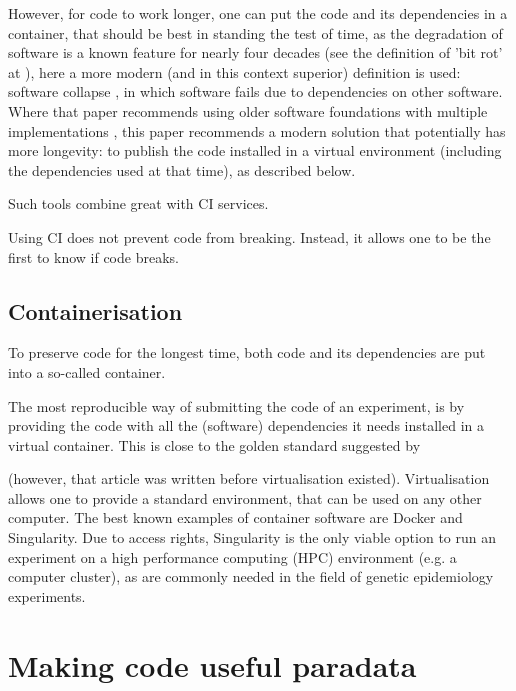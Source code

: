 However, for code to work longer, one can put the code and its dependencies in
a container, that should be best in standing the test of time,
as the degradation of software is a known feature for nearly 
four decades (see the definition of 'bit rot' at \cite{steele1983hacker}),
here a more modern (and in this context superior)
definition is used: software collapse \cite{hinsen2019dealing},
in which software fails due to dependencies on other 
software.
Where that paper recommends using older software foundations 
with multiple implementations \cite{hinsen2019dealing},
this paper recommends a modern solution that potentially has more 
longevity:
to publish the code installed in a virtual environment
(including the dependencies used at that time), as described below.

Such tools combine great with CI services.

Using CI does not prevent code from breaking. Instead,
it allows one to be the first to know if code breaks.

\subsection{Containerisation}

To preserve code for the longest time, 
both code and its dependencies are put into a so-called container.

The most reproducible way of submitting the code of an experiment,
is by providing the code with all the (software) dependencies 
it needs installed in a virtual container.
This is close to the golden standard suggested by 
\cite{peng2011reproducible} 

(however, that article was written before virtualisation existed).
Virtualisation allows one to provide a standard environment,
that can be used on any other computer.
The best known examples of container software are Docker and Singularity.
Due to access rights, Singularity is the only viable option to run
an experiment on a 
high performance computing (HPC) environment (e.g. a computer cluster),
as are commonly needed in the field of genetic epidemiology experiments.

\section{Making code useful paradata}\label{sec:making-code-useful-paradata}

